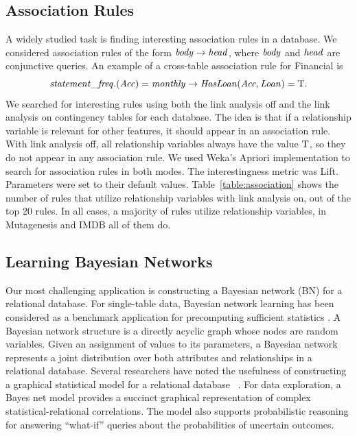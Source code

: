 \documentclass{acm_proc_article-sp}
\begin{document}
\subsection{Association Rules} A widely studied task is finding interesting association rules in a database. We considered association rules of the form $\it{body} \rightarrow \it{head}$, where $\it{body}$ and $\it{head}$ are conjunctive queries. An example of a cross-table association rule for Financial is 
%
$$\it{statement\_freq.(Acc)} = \it{monthly} \rightarrow \it{HasLoan}(\it{Acc},\it{Loan}) = \mathrm{T}.$$
We searched for interesting rules using both the link analysis off and the link analysis on contingency tables for each database. The idea is that if a relationship variable is relevant for other features, it should appear in an association rule. With link analysis off, all relationship variables always have the value $\mathrm{T}$, so they do not appear in any association rule. We used Weka's Apriori implementation to search for association rules in both modes. The interestingness metric was Lift. Parameters were set to their default values. Table~\ref{table:association} shows the number of rules that utilize relationship variables with link analysis on, out of the top 20 rules. In all cases, a majority of rules utilize relationship variables,  in Mutagenesis and IMDB all of them do. %
%
\begin{table}[htbp] \centering
{}
\caption{Number of top 20 Association Rules that utilize relationship variables.}
  \label{table:association}%
\end{table}%


\subsection{Learning Bayesian Networks}

Our most challenging application is constructing a Bayesian network (BN) for a relational database. For single-table data, Bayesian network learning has been considered as a benchmark application for precomputing sufficient statistics \cite{Moore1998,lv2012}. A Bayesian network structure is a directly acyclic graph whose nodes are random variables. Given an assignment of values to its parameters, a Bayesian network represents a joint distribution over both attributes and relationships in a relational database. Several researchers have noted the usefulness of constructing a graphical statistical model for a relational database ~\cite{Graepel_CIKM13,Wang2008}.
For data exploration, a Bayes net  model provides a succinct graphical representation of complex statistical-relational correlations. The model also supports probabilistic reasoning for answering ``what-if'' queries about the probabilities of uncertain outcomes. 
\end{document}
